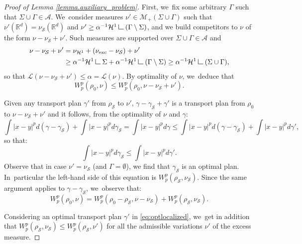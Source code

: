 \documentclass[10pt]{amsart}
\theoremstyle{definition}
\newcommand\LM[1]{\hbox{\vrule width.5pt \vbox to#1pt{\vfill \hrule width#1pt height.5pt}}}
\newcommand\LL{{\mathchoice {\>\LM7\>}{\>\LM7\>}{\,\LM5\,}{\,\LM{3.35}\,}}}
\newcommand{\mres}{\LL}
\newcommand\cH{\mathcal{H}}
\newcommand\cL{\mathcal{L}}
\newcommand{\RR}{\mathbb{R}}
\newcommand{\nuexc}{\nu_{\textup{exc}}}
\newcommand{\nuH}{\nu_{\cH^1}}
\begin{document}
\begin{proof}[Proof of Lemma \ref{lemma.auxiliary_problem}]
First, we~fix some arbitrary $\Gamma$ such that $\Sigma \cup \Gamma \in \mathcal{A}$. We~consider measures $\nu' \in \mathcal{M}_+(\Sigma\cup \Gamma)$ such that $\nu'(\RR^d) = \nu_{\mathcal{S}}(\RR^d)$ and $\nu' \ge \alpha^{-1}\mathcal{H}^1\mres (\Gamma\setminus \Sigma)$, and we build competitors to $\nu$ of the form $\nu - \nu_{\mathcal{S}} + \nu'$. Such measures are supported over $\Sigma \cup \Gamma \in \mathcal{A}$ and
\begin{align*}
\nu - \nu_{\mathcal{S}} + \nu'
&=
\nuH + (\nuexc - \nu_{\mathcal{S}}) + \nu'\\
&\ge
\alpha^{-1}\cH^1\mres \Sigma + \alpha^{-1}\cH^1\mres (\Gamma\setminus \Sigma)
\ge \alpha^{-1}\cH^1\mres (\Sigma \cup \Gamma),
\end{align*}
so that $\cL(\nu - \nu_{\mathcal{S}} + \nu') \le \alpha =\cL(\nu)$. By optimality of $\nu$, we~deduce that
\begin{equation*}
W_p^p(\rho_0, \nu) \le W_p^p(\rho_0, \nu - \nu_{\mathcal{S}} + \nu').
\end{equation*}

Given any transport plan $\gamma'$ from
$\rho_{\mathcal{S}}$ to $\nu'$, $\gamma-\gamma_{\mathcal{S}}+\gamma'$
is a transport plan from $\rho_0$ to $\nu - \nu_{\mathcal{S}} + \nu'$
and it follows, from the optimality of $\nu$ and $\gamma$:
\[
\int |x-y|^p d(\gamma-\gamma_{\mathcal S}) + \int |x-y|^p d\gamma_{\mathcal S} = \int |x-y|^p d\gamma
\le
\int |x-y|^p d(\gamma-\gamma_{\mathcal S}) + \int |x-y|^p d\gamma',
\]
so that:
\begin{equation}\label{eq:optlocalized}
\int |x-y|^p d\gamma_{\mathcal S}\le \int |x-y|^p d\gamma'.
\end{equation}
Observe that in case $\nu'=\nu_{\mathcal{S}}$ (and $\Gamma=\emptyset$),
we find that
$\gamma_{\mathcal{S}}$ is an optimal plan.
In~particular the left-hand side of this equation
is $W_p^p(\rho_{\mathcal{S}}, \nu_{\mathcal{S}})$.
Since the same argument applies to $\gamma-\gamma_{\mathcal{S}}$, we~observe
that:
\begin{equation}\label{rhoexc_decomposition_finer}
W_p^p(\rho_0, \nu)
=
W_p^p\left(\rho_0 - \rho_{\mathcal{S}}, \nu -\nu_{\mathcal{S}}\right)
+ W_p^p(\rho_{\mathcal{S}},\nu_{\mathcal{S}}).
\end{equation}

Considering an optimal transport plan $\gamma'$ in
\eqref{eq:optlocalized}, we~get in addition that $W_p^p\left(\rho_{\mathcal{S}}, \nu_{\mathcal{S}}\right) \le W_p^p\left(\rho_{\mathcal{S}}, \nu'\right)$
for all the admissible variations $\nu'$ of the excess measure.


\end{proof}
\end{document}
